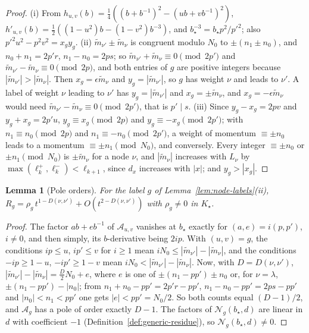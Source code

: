 \documentclass[twoside,10pt]{article}
\numberwithin{equation}{section}
\theoremstyle{slbody}
\newtheorem{lemma}[theorem]{Lemma}
\theoremstyle{definition}
\theoremstyle{remark}
\begin{document}
\begin{proof}
(i) From $h_{u,v}(b)=\frac14((b+b^{-1})^2-(ub+vb^{-1})^2)$,
$h'_{u,v}(b)=\frac12((1-u^2)b-(1-v^2)b^{-3})$, and
$b_\star^{-3}=b_\star p^2/p'^2$; also $p'^2u^2-p^2v^2=x_gy_g$.
(ii) $\tilde m_{\nu'}\pm \tilde m_\nu$ is congruent modulo $N_0$ to $\pm(n_1\pm n_0)$, and
$n_0+n_1=2p'r$, $n_1-n_0=2ps$; so $\tilde m_{\nu'}+\tilde m_\nu\equiv0\pmod{2p'}$ and
$\tilde m_{\nu'}-\tilde m_\nu\equiv0\pmod{2p}$, and both entries of $g$ are positive integers
because $|\tilde m_{\nu'}|>|\tilde m_\nu|$.  Then $x_g=\epsilon \tilde m_\nu$ and $y_g=|\tilde m_{\nu'}|$,
so $g$ has weight $\nu$ and leads to $\nu'$.  A label of weight $\nu$ leading
to $\nu'$ has $y_g=|\tilde m_{\nu'}|$ and $x_g=\pm \tilde m_\nu$, and $x_g=-\epsilon \tilde m_\nu$
would need $\tilde m_{\nu'}-\tilde m_\nu\equiv0\pmod{2p'}$, that is $p'\mid s$.
(iii) Since $y_g-x_g=2pv$ and $y_g+x_g=2p'u$, $y_g\equiv x_g\pmod{2p}$ and
$y_g\equiv-x_g\pmod{2p'}$; with $n_1\equiv n_0\pmod{2p}$ and
$n_1\equiv-n_0\pmod{2p'}$, a weight of momentum $\equiv\pm n_0$ leads to a
momentum $\equiv\pm n_1\pmod{N_0}$, and conversely.  Every integer
$\equiv\pm n_0$ or $\pm n_1\pmod{N_0}$ is $\pm \tilde m_\nu$ for a node $\nu$, and
$|\tilde m_\nu|$ increases with $L_\nu$ by $\max(\ell^+_k,\ell^-_k)<\ell_{k+1}$, since
$d_x$ increases with $|x|$; and $y_g>|x_g|$.
\end{proof}

\begin{lemma}[Pole orders]\label{lem:node-poles}
For the label $g$ of Lemma~\ref{lem:node-labels}(ii),
$R_g=\rho_g\,t^{1-D(\nu,\nu')}+O(t^{2-D(\nu,\nu')})$ with $\rho_g\neq0$ in $K_\star$.
\end{lemma}

\begin{proof}
The factor $ab+eb^{-1}$ of ${\mathcal A}_{u,v}$ vanishes at $b_\star$ exactly
for $(a,e)=i(p,p')$, $i\neq0$, and then simply, its $b$-derivative being $2ip$.
With $(u,v)=g$, the conditions $ip\leq u$, $ip'\leq v$ for $i\geq1$ mean
$iN_0\leq|\tilde m_{\nu'}|-|\tilde m_\nu|$, and the conditions $-ip\geq1-u$, $-ip'\geq1-v$
mean $iN_0<|\tilde m_{\nu'}|-|\tilde m_\nu|$.  Now, with $D=D(\nu,\nu')$, $|\tilde m_{\nu'}|-|\tilde m_\nu|=\frac D2N_0+e$,
where $e$ is one of $\pm(n_1-pp')\pm n_0$ or, for $\nu=\lambda$,
$\pm(n_1-pp')-|n_0|$; from $n_1+n_0-pp'=2p'r-pp'$, $n_1-n_0-pp'=2ps-pp'$ and
$|n_0|<n_1<pp'$ one gets $|e|<pp'=N_0/2$.  So both counts equal $(D-1)/2$,
and ${\mathcal A}_g$ has a pole of order exactly $D-1$.  The factors of
${\mathcal N}_g(b_\star,d)$ are linear in $d$ with coefficient $-1$
(Definition~\ref{def:generic-residue}), so ${\mathcal N}_g(b_\star,d)\neq0$.
\end{proof}
\end{document}
